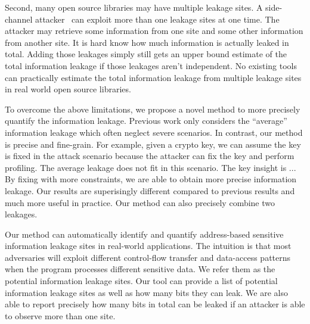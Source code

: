 Second, many open source libraries may have multiple leakage sites. 
A side-channel attacker~\cite{191010,7163052} can exploit more than one leakage sites at one time. 
The attacker may retrieve some information from one site and some other information 
from another site.
It is hard know how much information is actually leaked in total. Adding those leakages 
simply still gets an upper bound estimate of the total information leakage if those 
leakages aren’t independent. No existing tools can practically estimate the total information 
leakage from multiple leakage sites in real world open source libraries.

To overcome the above limitations, we propose a novel method
to more precisely quantify the information leakage. Previous work only considers the
``average'' information leakage which often neglect severe scenarios.
In contrast, our method is precise and fine-grain. 
For example, given a crypto key, we can assume the key is fixed
in the attack scenario because the attacker can fix the key and perform profiling.
The average leakage does not fit in this scenario.
The key insight is ...  
By fixing with more constraints, we are able to obtain more precise information leakage.
Our results are superisingly different compared to previous results
and much more useful in practice.
Our method can also precisely combine two leakages. 

Our method can automatically identify and quantify address-based
sensitive information leakage sites in real-world applications. The intuition is that most
adversaries will exploit different control-flow transfer and data-access patterns when 
the program processes different sensitive data. We refer them as the potential information
leakage sites. Our tool can provide a list of potential information leakage sites as well as how many 
bits they can leak. We are also able to report precisely how many bits in total
can be leaked if an attacker is able to observe more than one site.


